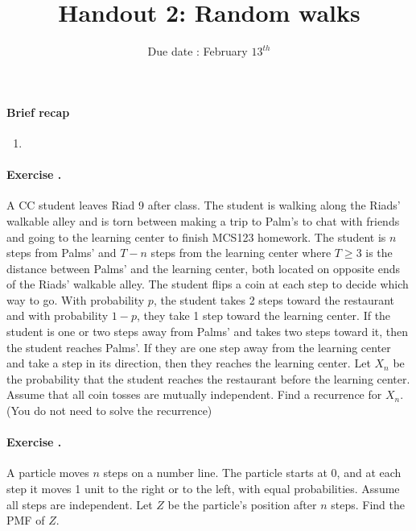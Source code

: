 \documentclass[twocolumn,12pt,a4paper]{article}
\title{ \bfseries \Huge {Handout 2: Random walks }}
\date{Due date : February $13^{th}$}
\newcounter{num}  %
\begin{document}
	\maketitle
	\setcounter{num}{1}  %
	
	\thispagestyle{empty} 
	\paragraph{Brief recap}
	\begin{enumerate}
	\item 	
		\end{enumerate}


\paragraph{Exercise \thenum.}

A CC student leaves Riad 9 after class.
The student is walking along the Riads' walkable alley and is torn between making a trip to Palm's to chat with friends and going to the learning center to finish MCS123 homework. 
The student is $n$ steps from Palms' and $T-n$ steps from the learning center where $T \geq 3$ is the distance between Palms' and the
learning center, both located on opposite ends of the Riads' walkable alley. 
The student flips a coin at each step to decide which way to go. 
With probability $p$, the student takes 2 steps toward the restaurant and with probability $1-p$, they take 1 step toward the learning center. 
If the student is one or two steps away from Palms' and takes two steps toward it, then the student reaches Palms'. 
If they are one step away from the learning center and take a step in its direction, then they reaches the learning center. 
Let $X_n$ be the probability that the student reaches the
restaurant before the learning center. 
Assume that all coin tosses are mutually independent.
Find a recurrence for $X_n$. (You do not need to solve the recurrence)



\paragraph{Exercise \thenum.}
A particle moves $n$ steps on a number line. 
The particle starts at 0, and at each step it moves 1 unit to the right or to the left, with equal probabilities. 
Assume all steps are independent. 
Let $Z$ be the particle's position after $n$ steps. 
Find the PMF of $Z$. 
\end{document}
